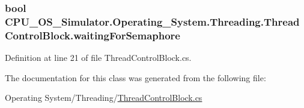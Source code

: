 \subsubsection[{waiting\+For\+Semaphore}]{\setlength{\rightskip}{0pt plus 5cm}bool C\+P\+U\+\_\+\+O\+S\+\_\+\+Simulator.\+Operating\+\_\+\+System.\+Threading.\+Thread\+Control\+Block.\+waiting\+For\+Semaphore\hspace{0.3cm}{\ttfamily [private]}}\label{class_c_p_u___o_s___simulator_1_1_operating___system_1_1_threading_1_1_thread_control_block_ad779f070727d0c5c33f5e65cc9b1a8dc}


Definition at line 21 of file Thread\+Control\+Block.\+cs.



The documentation for this class was generated from the following file\+:\begin{DoxyCompactItemize}
\item 
Operating System/\+Threading/\hyperlink{_thread_control_block_8cs}{Thread\+Control\+Block.\+cs}\end{DoxyCompactItemize}
